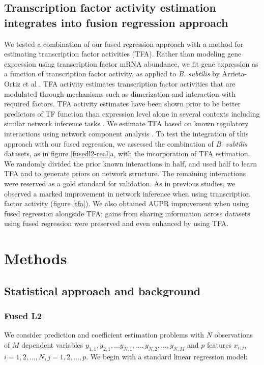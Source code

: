 \documentclass[11pt]{article}
\begin{document}
\subsection{Transcription factor activity estimation integrates into fusion regression approach}
We tested a combination of our fused regression approach with a method for estimating transcription factor activities (TFA). 
Rather than modeling gene expression using transcription factor mRNA abundance, we fit gene expression as a function of transcription factor activity, as applied to \textit{B. subtilis} by Arrieta-Ortiz et al \cite{arrieta-ortiz_experimentally_2015}. 
TFA activity estimates  transcription factor activities that are modulated through mechanisms such as dimerization and interaction with required factors.
TFA activity estimates have been shown prior to be better predictors of TF function than expression level alone in several contexts including similar network inference tasks\cite{fu_reconstructing_2011} \cite{arrieta-ortiz_experimentally_2015}. 
We estimate TFA based on known regulatory interactions using network component analysis \cite{liao2003network}.
To test the integration of this approach with our fused regression, we assessed the combination of \textit{B. subtilis} datasets, as in figure \ref{fusedl2-real}a, with the incorporation of TFA estimation. 
We randomly divided the prior known interactions in half, and used half to learn TFA and to generate priors on network structure. 
The remaining interactions were reserved as a gold standard for validation. 
As in previous studies, we observed a marked improvement in network inference when using transcription factor activity (figure \ref{tfa}). We also obtained AUPR improvement when using fused regression alongside TFA; gains from sharing information across datasets using fused regression were preserved and even enhanced by using TFA. 

\section{Methods}

\subsection{Statistical approach and background}
\subsubsection{Fused L2}
We consider prediction and coefficient estimation problems with $N$ observations of $M$ dependent variables $y_{1,1}, y_{2,1}, ...y_{N,1},..., y_{N,2},..., y_{N, M}$ and $p$ features $x_{i,j}$, $i=1,2,...,N, j=1,2,...,p$. We begin with a standard linear regression model:
\end{document}
